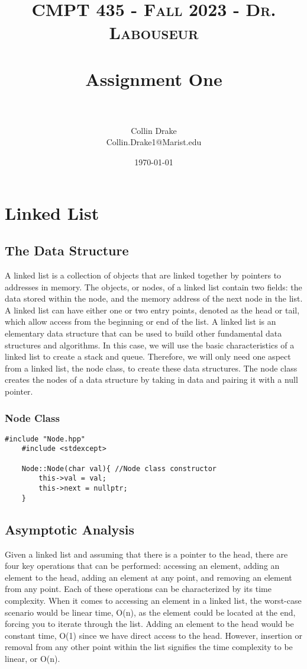 \documentclass[letterpaper, 10pt,DIV=13]{scrartcl}
\title{	
   \normalfont \normalsize 
   \textsc{CMPT 435 - Fall 2023 - Dr. Labouseur} \\[10pt] %
   \horrule{0.5pt} \\[0.25cm] 	%
   \huge Assignment One  \\     	    %
   \horrule{0.5pt} \\[0.25cm] 	%
}
\author{Collin Drake \\ \normalsize Collin.Drake1@Marist.edu}
\date{\normalsize\today} 	%
\numberwithin{equation}{section} %
\numberwithin{figure}{section} %
\numberwithin{table}{section} %
\begin{document}
\maketitle %

\section{Linked List}

\subsection{The Data Structure}
A linked list is a collection of objects that are linked together by pointers to addresses in memory. The objects, or nodes, of a linked list contain two fields: the data stored within the node, and the memory address of the next node in the list. A linked list can have either one or two entry points, denoted as the head or tail, which allow access from the beginning or end of the list. A linked list is an elementary data structure that can be used to build other fundamental data structures and algorithms. In this case, we will use the basic characteristics of a linked list to create a stack and queue. Therefore, we will only need one aspect from a linked list, the node class, to create these data structures. The node class creates the nodes of a data structure by taking in data and pairing it with a null pointer.

\subsubsection*{Node Class}
    \lstset{numbers=left, numberstyle=\tiny, stepnumber=1, numbersep=5pt, basicstyle=\footnotesize\ttfamily}
    \begin{lstlisting}[frame=single, ]
    #include "Node.hpp"
    #include <stdexcept>

    Node::Node(char val){ //Node class constructor
        this->val = val;
        this->next = nullptr;
    }

\end{lstlisting}

\subsection{Asymptotic Analysis}
Given a linked list and assuming that there is a pointer to the head, there are four key operations that can be performed: accessing an element, adding an element to the head, adding an element at any point, and removing an element from any point. Each of these operations can be characterized by its time complexity. When it comes to accessing an element in a linked list, the worst-case scenario would be linear time, O(n), as the element could be located at the end, forcing you to iterate through the list. Adding an element to the head would be constant time, O(1) since we have direct access to the head. However, insertion or removal from any other point within the list signifies the time complexity to be linear, or O(n).
\end{document}
